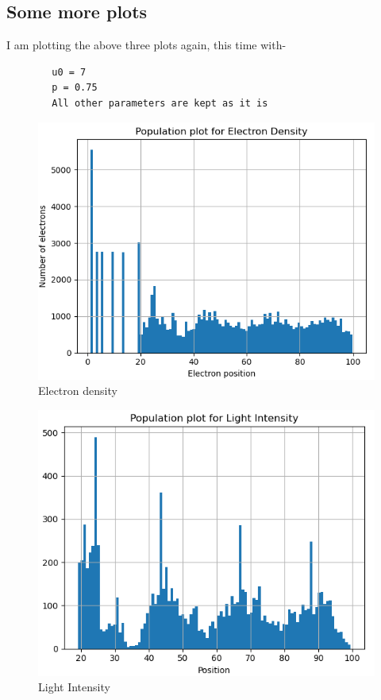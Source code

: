 \documentclass[11pt, a4paper]{article}
\begin{document}
\subsection{Some more plots}
    I am plotting the above three plots again, this time with-
    \begin{verbatim}
        u0 = 7
        p = 0.75
        All other parameters are kept as it is
    \end{verbatim}
    \begin{figure}[!h]
        \centering
        \includegraphics[scale = 0.6]{Figure 5.png}
        \caption{Electron density}
        \label{fig:Figure 5}
    \end{figure}
    \begin{figure}[!h]
        \centering
        \includegraphics[scale = 0.65]{Figure 6.png}
        \caption{Light Intensity}
        \label{fig:Figure 6}
    \end{figure}
\end{document}
